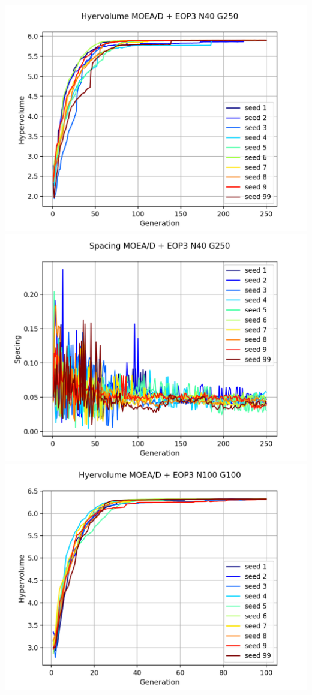 \begin{center}
\includegraphics[scale=0.5]{figures/METRICS_EOP3/Hypervol_N40_G250.png}\quad 
\includegraphics[scale=0.5]{figures/METRICS_EOP3/Spacing_N40_G250.png}\\
\includegraphics[scale=0.5]{figures/METRICS_EOP3/Hypervol_N100_G100.png} \quad 

\end{center}
